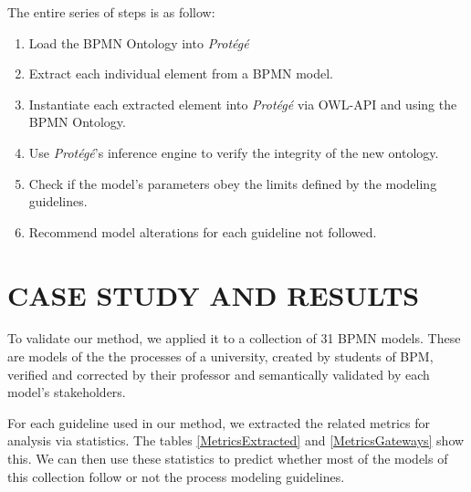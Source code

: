 \documentclass[a4paper,twoside]{article}
\begin{document}
The entire series of steps is as follow:

\begin{enumerate}
	\item Load the BPMN Ontology into \textit{Protégé}
	\item Extract each individual element from a BPMN model.
	\item Instantiate each extracted element into \textit{Protégé} via OWL-API and using the BPMN Ontology.
	\item Use \textit{Protégé}'s inference engine to verify the integrity of the new ontology.
	\item Check if the model's parameters obey the limits defined by the modeling guidelines.
	\item Recommend model alterations for each guideline not followed.
\end{enumerate}





\section{CASE STUDY AND RESULTS}\label{CaseStudy}

\noindent To validate our method, we applied it to a collection of 31 BPMN models. These are models of the the processes of a university, created by students of BPM, verified and corrected by their professor and semantically validated by each model's stakeholders. 

For each guideline used in our method, we extracted the related metrics for analysis via statistics. The tables \ref{MetricsExtracted} and \ref{MetricsGateways} show this. We can then use these statistics to predict whether most of the models of this collection follow or not the process modeling guidelines. 
\end{document}
